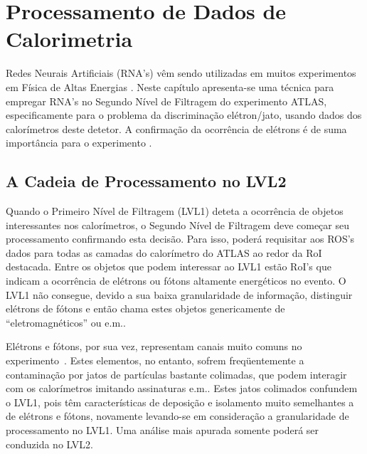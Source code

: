 \typeout{ ====================================================================}
\typeout{ ====================================================================}

\chapter{Processamento de Dados de Calorimetria}
\label{chap:msc}

Redes Neurais Artificiais (RNA's) vêm sendo utilizadas em muitos experimentos
em Física de Altas Energias \cite{nnet-hera, daq11, nnet-hep, nnet-cdf}. Neste
capítulo apresenta-se uma técnica para empregar RNA's no Segundo Nível de
Filtragem do experimento ATLAS, especificamente para o problema da
discriminação elétron/jato, usando dados dos calorímetros deste detetor. A
confirmação da ocorrência de elétrons é de suma importância para o
experimento \cite{trigger-tpr}.

\section{A Cadeia de Processamento no LVL2}

Quando o Primeiro Nível de Filtragem (LVL1) deteta a ocorrência de objetos
interessantes nos calorímetros, o Segundo Nível de Filtragem deve começar seu
processamento confirmando esta decisão. Para isso, poderá requisitar aos ROS's
dados para todas as camadas do calorímetro do ATLAS ao redor da RoI
destacada. Entre os objetos que podem interessar ao LVL1 estão RoI's que
indicam a ocorrência de elétrons ou fótons altamente energéticos no evento. O
LVL1 não consegue, devido a sua baixa granularidade de informação, distinguir
elétrons de fótons e então chama estes objetos genericamente de
``eletromagnéticos'' ou e.m..

E\-lé\-trons e fó\-tons, por sua vez, representam canais muito comuns no
experimento~\cite{trigger-tpr}. Estes elementos, no entanto, sofrem
freqüentemente a contaminação por jatos de partículas bastante colimadas, que
podem interagir com os calorímetros imitando assinaturas e.m.. Estes jatos
colimados confundem o LVL1, pois têm características de deposição e isolamento
muito semelhantes a de elétrons e fótons, novamente levando-se em consideração
a granularidade de processamento no LVL1. Uma análise mais apurada somente
poderá ser conduzida no LVL2.

